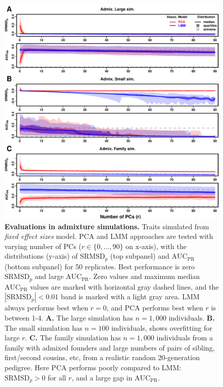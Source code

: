 \documentclass[11pt]{article}
\newcommand{\rmsd}{\text{SRMSD}_p}
\newcommand{\auc}{\text{AUC}_\text{PR}}
\begin{document}
\begin{figure}[bp!]
  \centering
  \includegraphics[width=\textwidth,height=\textheight,keepaspectratio]{fes/rmsd-auc-sim.pdf}
  \caption{
    {\small 
      {\bf Evaluations in admixture simulations.}
      Traits simulated from \textit{fixed effect sizes} model.
      PCA and LMM approaches are tested with varying number of PCs ($r \in \{0, ..., 90\}$ on x-axis), with the distributions (y-axis) of $\rmsd$ (top subpanel) and $\auc$ (bottom subpanel) for 50 replicates.
      Best performance is zero $\rmsd$ and large $\auc$.
      Zero values and maximum median $\auc$ values are marked with horizontal gray dashed lines, and the $|\rmsd| < 0.01$ band is marked with a light gray area.
      LMM always performs best when $r=0$, and PCA performs best when $r$ is between 1-4.
      \textbf{A.}
      The large simulation has $n = 1,000$ individuals.
      \textbf{B.}
      The small simulation has $n = 100$ individuals, shows overfitting for large $r$.
      \textbf{C.}
      The family simulation has $n = 1,000$ individuals from a family with admixed founders and large numbers of pairs of sibling, first/second cousins, etc, from a realistic random 20-generation pedigree.
      Here PCA performs poorly compared to LMM: $\rmsd > 0$ for all $r$, and a large gap in $\auc$.
    }
  }
  \label{fig:rmsd-auc-sim}
\end{figure}
\end{document}
